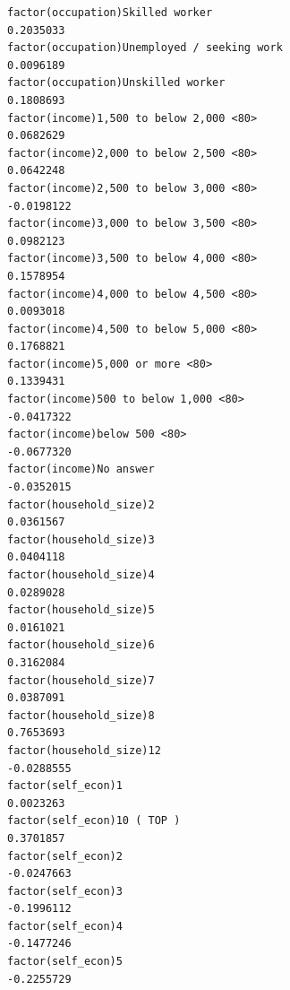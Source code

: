 \documentclass[
]{article}
\begin{document}
\begin{table}
\begin{minipage}[t]{\linewidth}
{\begin{verbatim}
factor(occupation)Skilled worker                                                   0.2035033
factor(occupation)Unemployed / seeking work                                        0.0096189
factor(occupation)Unskilled worker                                                 0.1808693
factor(income)1,500 to below 2,000 <80>                                            0.0682629
factor(income)2,000 to below 2,500 <80>                                            0.0642248
factor(income)2,500 to below 3,000 <80>                                           -0.0198122
factor(income)3,000 to below 3,500 <80>                                            0.0982123
factor(income)3,500 to below 4,000 <80>                                            0.1578954
factor(income)4,000 to below 4,500 <80>                                            0.0093018
factor(income)4,500 to below 5,000 <80>                                            0.1768821
factor(income)5,000 or more <80>                                                   0.1339431
factor(income)500 to below 1,000 <80>                                             -0.0417322
factor(income)below 500 <80>                                                      -0.0677320
factor(income)No answer                                                           -0.0352015
factor(household_size)2                                                            0.0361567
factor(household_size)3                                                            0.0404118
factor(household_size)4                                                            0.0289028
factor(household_size)5                                                            0.0161021
factor(household_size)6                                                            0.3162084
factor(household_size)7                                                            0.0387091
factor(household_size)8                                                            0.7653693
factor(household_size)12                                                          -0.0288555
factor(self_econ)1                                                                 0.0023263
factor(self_econ)10 ( TOP )                                                        0.3701857
factor(self_econ)2                                                                -0.0247663
factor(self_econ)3                                                                -0.1996112
factor(self_econ)4                                                                -0.1477246
factor(self_econ)5                                                                -0.2255729

\end{verbatim}}
\end{minipage}
\end{table}
\end{document}
